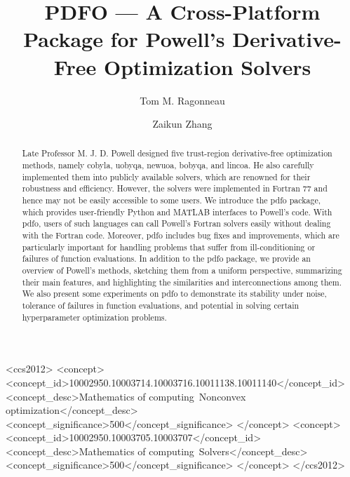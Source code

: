 \documentclass[manuscript,screen,review]{acmart}
\numberwithin{equation}{section}
\begin{document}
\title{PDFO --- A Cross-Platform Package for Powell's Derivative-Free Optimization Solvers}
\author{Tom M. Ragonneau}
\author{Zaikun Zhang}

\begin{abstract}
    Late Professor M. J. D. Powell designed five trust-region derivative-free optimization methods, namely \gls{cobyla}, \gls{uobyqa}, \gls{newuoa}, \gls{bobyqa}, and \gls{lincoa}.
    He also carefully implemented them into publicly available solvers, which are renowned for their robustness and efficiency.
    However, the solvers were implemented in Fortran 77 and hence may not be easily accessible to some users.
    We introduce the \gls{pdfo} package, which provides user-friendly Python and MATLAB interfaces to Powell's code.
    With \gls{pdfo}, users of such languages can call Powell's Fortran solvers easily without dealing with the Fortran code.
    Moreover, \gls{pdfo} includes bug fixes and improvements, which are particularly important for handling problems that suffer from ill-conditioning or failures of function evaluations.
    In addition to the \gls{pdfo} package, we provide an overview of Powell's methods, sketching them from a uniform perspective, summarizing their main features, and highlighting the similarities and interconnections among them.
    We also present some experiments on \gls{pdfo} to demonstrate its stability under noise, tolerance of failures in function evaluations, and potential in solving certain hyperparameter optimization problems.
\end{abstract}

\begin{CCSXML}
<ccs2012>
    <concept>
        <concept_id>10002950.10003714.10003716.10011138.10011140</concept_id>
        <concept_desc>Mathematics of computing~Nonconvex optimization</concept_desc>
        <concept_significance>500</concept_significance>
    </concept>
    <concept>
        <concept_id>10002950.10003705.10003707</concept_id>
        <concept_desc>Mathematics of computing~Solvers</concept_desc>
        <concept_significance>500</concept_significance>
    </concept>
</ccs2012>
\end{CCSXML}
\end{document}
